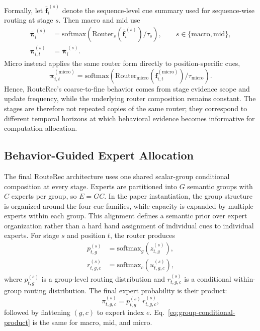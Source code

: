 \documentclass[sigconf,review,anonymous]{acmart}
\begin{document}
Formally, let $\bar{\mathbf{f}}_i^{\,(s)}$ denote the sequence-level cue summary used for sequence-wise routing at stage $s$. Then macro and mid use
\[
\begin{aligned}
\bar{\boldsymbol{\pi}}_i^{\,(s)}
&=
\mathrm{softmax}\!\left(\mathrm{Router}_s(\bar{\mathbf{f}}_i^{\,(s)})/\tau_s\right),
\qquad s\in\{\mathrm{macro},\mathrm{mid}\}, \\
\boldsymbol{\pi}^{(s)}_{i,t}
&=
\bar{\boldsymbol{\pi}}_i^{\,(s)}.
\end{aligned}
\]
Micro instead applies the same router form directly to position-specific cues,
\[
\boldsymbol{\pi}^{(\mathrm{micro})}_{i,t}
=
\mathrm{softmax}\!\left(\mathrm{Router}_{\mathrm{micro}}(\mathbf{f}^{(\mathrm{micro})}_{i,t})/\tau_{\mathrm{micro}}\right).
\]
Hence, RouteRec's coarse-to-fine behavior comes from stage evidence scope and update frequency, while the underlying router composition remains constant. The stages are therefore not repeated copies of the same router; they correspond to different temporal horizons at which behavioral evidence becomes informative for computation allocation.

\subsection{Behavior-Guided Expert Allocation}

The final RouteRec architecture uses one shared scalar-group conditional composition at every stage. Experts are partitioned into $G$ semantic groups with $C$ experts per group, so $E=GC$. In the paper instantiation, the group structure is organized around the four cue families, while capacity is expanded by multiple experts within each group. This alignment defines a semantic prior over expert organization rather than a hard hand assignment of individual cues to individual experts. For stage $s$ and position $t$, the router produces
\begin{align}
p^{(s)}_{t,g} &= \mathrm{softmax}_g\!\left(z^{(s)}_{t,g}\right), \\
r^{(s)}_{t,g,c} &= \mathrm{softmax}_c\!\left(u^{(s)}_{t,g,c}\right),
\end{align}
where $p^{(s)}_{t,g}$ is a group-level routing distribution and $r^{(s)}_{t,g,c}$ is a conditional within-group routing distribution. The final expert probability is their product:
\begin{equation}
\pi^{(s)}_{t,g,c}=p^{(s)}_{t,g}\,r^{(s)}_{t,g,c},
\label{eq:group-conditional-product}
\end{equation}
followed by flattening $(g,c)$ to expert index $e$. Eq.~\eqref{eq:group-conditional-product} is the same for macro, mid, and micro.
\end{document}
